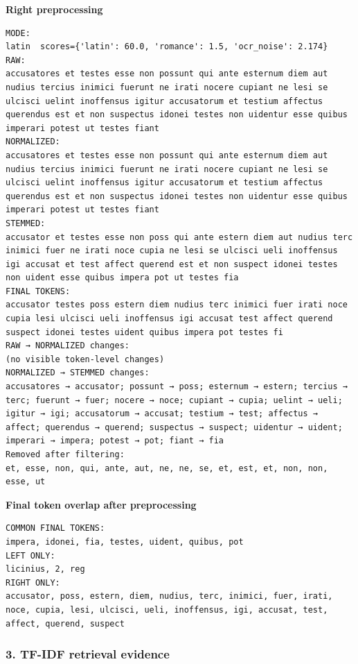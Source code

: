 \textbf{Right preprocessing} 

\begin{lstlisting}[breaklines=true,basicstyle=\ttfamily\small]
MODE:
latin  scores={'latin': 60.0, 'romance': 1.5, 'ocr_noise': 2.174}
RAW:
accusatores et testes esse non possunt qui ante esternum diem aut nudius tercius inimici fuerunt ne irati nocere cupiant ne lesi se ulcisci uelint inoffensus igitur accusatorum et testium affectus querendus est et non suspectus idonei testes non uidentur esse quibus imperari potest ut testes fiant
NORMALIZED:
accusatores et testes esse non possunt qui ante esternum diem aut nudius tercius inimici fuerunt ne irati nocere cupiant ne lesi se ulcisci uelint inoffensus igitur accusatorum et testium affectus querendus est et non suspectus idonei testes non uidentur esse quibus imperari potest ut testes fiant
STEMMED:
accusator et testes esse non poss qui ante estern diem aut nudius terc inimici fuer ne irati noce cupia ne lesi se ulcisci ueli inoffensus igi accusat et test affect querend est et non suspect idonei testes non uident esse quibus impera pot ut testes fia
FINAL TOKENS:
accusator testes poss estern diem nudius terc inimici fuer irati noce cupia lesi ulcisci ueli inoffensus igi accusat test affect querend suspect idonei testes uident quibus impera pot testes fi
RAW → NORMALIZED changes:
(no visible token-level changes)
NORMALIZED → STEMMED changes:
accusatores → accusator; possunt → poss; esternum → estern; tercius → terc; fuerunt → fuer; nocere → noce; cupiant → cupia; uelint → ueli; igitur → igi; accusatorum → accusat; testium → test; affectus → affect; querendus → querend; suspectus → suspect; uidentur → uident; imperari → impera; potest → pot; fiant → fia
Removed after filtering:
et, esse, non, qui, ante, aut, ne, ne, se, et, est, et, non, non, esse, ut
\end{lstlisting}

\textbf{Final token overlap after preprocessing} 

\begin{lstlisting}[breaklines=true,basicstyle=\ttfamily\small]
COMMON FINAL TOKENS:
impera, idonei, fia, testes, uident, quibus, pot
LEFT ONLY:
licinius, 2, reg
RIGHT ONLY:
accusator, poss, estern, diem, nudius, terc, inimici, fuer, irati, noce, cupia, lesi, ulcisci, ueli, inoffensus, igi, accusat, test, affect, querend, suspect
\end{lstlisting}

\subsubsection{3. TF-IDF retrieval evidence}


